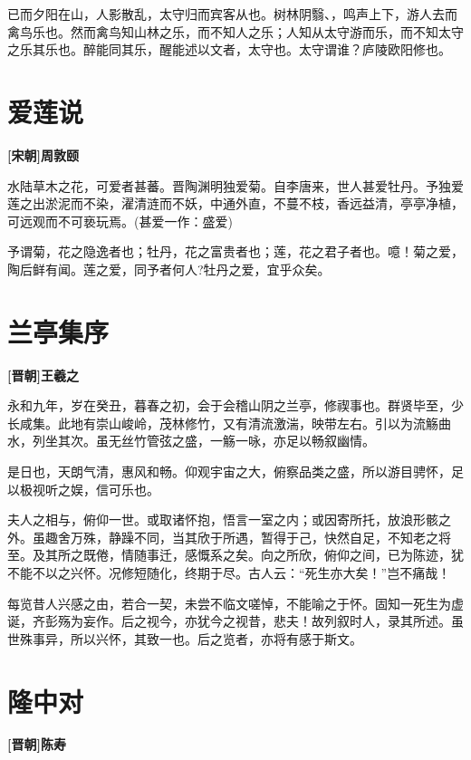 \documentclass[UTF8,titlepage,oneside]{ctexbook}
\begin{document}
已而夕阳在山，人影散乱，太守归而宾客从也。树林阴翳、，鸣声上下，游人去而禽鸟乐也。然而禽鸟知山林之乐，而不知人之乐；人知从太守游而乐，而不知太守之乐其乐也。醉能同其乐，醒能述以文者，太守也。太守谓谁？庐陵欧阳修也。



\chapter*{爱莲说}
\begin{center}
	\textbf{[宋朝]周敦颐}
\end{center}

水陆草木之花，可爱者甚蕃。晋陶渊明独爱菊。自李唐来，世人甚爱牡丹。予独爱莲之出淤泥而不染，濯清涟而不妖，中通外直，不蔓不枝，香远益清，亭亭净植，可远观而不可亵玩焉。(甚爱一作：盛爱)

予谓菊，花之隐逸者也；牡丹，花之富贵者也；莲，花之君子者也。噫！菊之爱，陶后鲜有闻。莲之爱，同予者何人?牡丹之爱，宜乎众矣。


\chapter*{兰亭集序}
\begin{center}
	\textbf{[晋朝]王羲之}
\end{center}

永和九年，岁在癸丑，暮春之初，会于会稽山阴之兰亭，修禊事也。群贤毕至，少长咸集。此地有崇山峻岭，茂林修竹，又有清流激湍，映带左右。引以为流觞曲水，列坐其次。虽无丝竹管弦之盛，一觞一咏，亦足以畅叙幽情。


是日也，天朗气清，惠风和畅。仰观宇宙之大，俯察品类之盛，所以游目骋怀，足以极视听之娱，信可乐也。


夫人之相与，俯仰一世。或取诸怀抱，悟言一室之内；或因寄所托，放浪形骸之外。虽趣舍万殊，静躁不同，当其欣于所遇，暂得于己，快然自足，不知老之将至。及其所之既倦，情随事迁，感慨系之矣。向之所欣，俯仰之间，已为陈迹，犹不能不以之兴怀。况修短随化，终期于尽。古人云：“死生亦大矣！”岂不痛哉！


每览昔人兴感之由，若合一契，未尝不临文嗟悼，不能喻之于怀。固知一死生为虚诞，齐彭殇为妄作。后之视今，亦犹今之视昔，悲夫！故列叙时人，录其所述。虽世殊事异，所以兴怀，其致一也。后之览者，亦将有感于斯文。



\chapter*{隆中对}
\begin{center}
	\textbf{[晋朝]陈寿}
\end{center}
\end{document}
